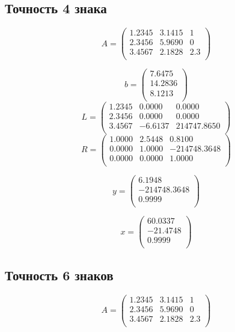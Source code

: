 \documentclass[11pt,a4paper,oneside]{article}
\begin{document}
\subsection{Точность 4 знака}

$$ A = \left(\begin{matrix}
	1.2345 & 3.1415 & 1 \\
	2.3456 & 5.9690 & 0 \\
	3.4567 & 2.1828 & 2.3 \\
\end{matrix}\right) $$

$$ b = \left(\begin{matrix}
	7.6475 \\
	14.2836 \\
	8.1213 \\
\end{matrix}\right) $$
$$ L = \left(\begin{matrix}
	1.2345 & 0.0000 & 0.0000 \\
	2.3456 & 0.0000 & 0.0000 \\
	3.4567 & -6.6137 & 214747.8650 \\
\end{matrix}\right) $$
$$ R = \left(\begin{matrix}
	1.0000 & 2.5448 & 0.8100 \\
	0.0000 & 1.0000 & -214748.3648 \\
	0.0000 & 0.0000 & 1.0000 \\
\end{matrix}\right) $$

$$ y = \left(\begin{matrix}
	6.1948 \\
	-214748.3648 \\
	0.9999 \\
\end{matrix}\right) $$

$$ x = \left(\begin{matrix}
	60.0337 \\
	-21.4748 \\
	0.9999 \\
\end{matrix}\right) $$

\subsection{Точность 6 знаков}

$$ A = \left(\begin{matrix}
	1.2345 & 3.1415 & 1 \\
	2.3456 & 5.9690 & 0 \\
	3.4567 & 2.1828 & 2.3 \\
\end{matrix}\right) $$
\end{document}
